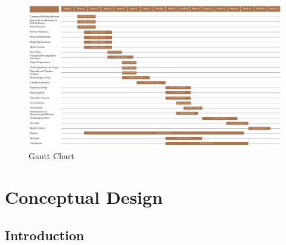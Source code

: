 \documentclass[12pt]{report}
\begin{document}
\FloatBarrier

% 

\begin{figure}
    \centering
    \includegraphics[angle=90, width=\linewidth, height=1.5\linewidth]{Ekran Resmi 2024-11-15 20.07.48.png}
    \caption{Gantt Chart}
    \label{fig:gannt}
\end{figure}

\chapter{Conceptual Design}

\section{Introduction}
\end{document}
